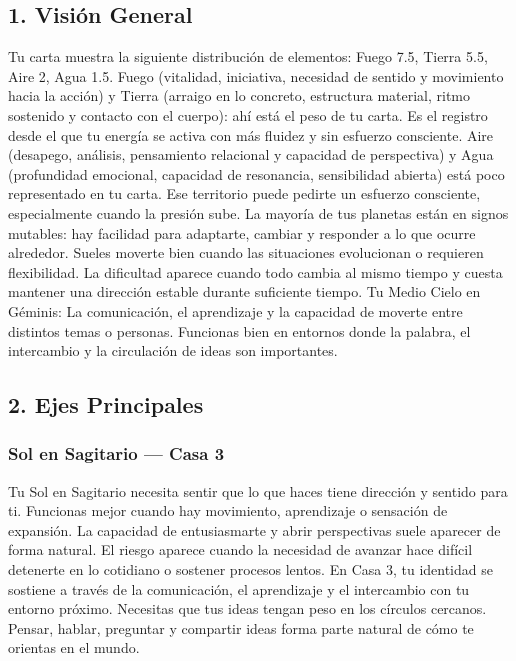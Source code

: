 \documentclass[11pt,a4paper]{article}\usepackage[utf8]{inputenc}
\begin{document}
\vspace{0.5cm}

\subsection{1. Visión General}

Tu carta muestra la siguiente distribución de elementos: Fuego 7.5, Tierra 5.5, Aire 2, Agua 1.5. Fuego (vitalidad, iniciativa, necesidad de sentido y movimiento hacia la acción) y Tierra (arraigo en lo concreto, estructura material, ritmo sostenido y contacto con el cuerpo): ahí está el peso de tu carta. Es el registro desde el que tu energía se activa con más fluidez y sin esfuerzo consciente. Aire (desapego, análisis, pensamiento relacional y capacidad de perspectiva) y Agua (profundidad emocional, capacidad de resonancia, sensibilidad abierta) está poco representado en tu carta. Ese territorio puede pedirte un esfuerzo consciente, especialmente cuando la presión sube. La mayoría de tus planetas están en signos mutables: hay facilidad para adaptarte, cambiar y responder a lo que ocurre alrededor. Sueles moverte bien cuando las situaciones evolucionan o requieren flexibilidad. La dificultad aparece cuando todo cambia al mismo tiempo y cuesta mantener una dirección estable durante suficiente tiempo. Tu Medio Cielo en Géminis: La comunicación, el aprendizaje y la capacidad de moverte entre distintos temas o personas. Funcionas bien en entornos donde la palabra, el intercambio y la circulación de ideas son importantes.

\subsection{2. Ejes Principales}

\subsubsection*{Sol en Sagitario — Casa 3}
Tu Sol en Sagitario necesita sentir que lo que haces tiene dirección y sentido para ti. Funcionas mejor cuando hay movimiento, aprendizaje o sensación de expansión. La capacidad de entusiasmarte y abrir perspectivas suele aparecer de forma natural. El riesgo aparece cuando la necesidad de avanzar hace difícil detenerte en lo cotidiano o sostener procesos lentos. En Casa 3, tu identidad se sostiene a través de la comunicación, el aprendizaje y el intercambio con tu entorno próximo. Necesitas que tus ideas tengan peso en los círculos cercanos. Pensar, hablar, preguntar y compartir ideas forma parte natural de cómo te orientas en el mundo.
\end{document}
